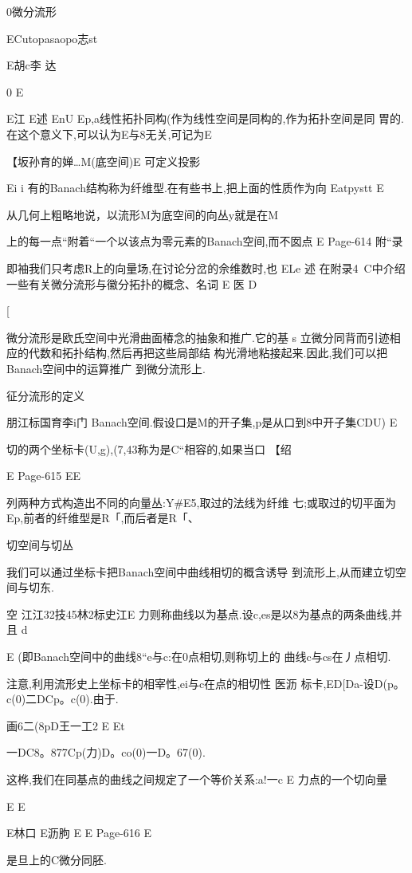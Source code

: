 {0微分流形

ECutopasaopo志st

E胡c李
达

0
E

E江
E述
EnU
Ep,a线性拓扑同构(作为线性空间是同构的,作为拓扑空间是同
胃的.在这个意义下,可以认为E与8无关,可记为E

【坂孙育的婵…M(底空间)E
可定义投影

Ei
i
有的Banach结构称为纤维型.在有些书上,把上面的性质作为向
Eatpystt
E

从几何上粗略地说，以流形M为底空间的向丛y就是在M

上的每一点“附着“一个以该点为零元素的Banach空间,而不囡点
E
Page-614
附“录

即袖我们只考虑R上的向量场,在讨论分岔的佘维数时,也
ELe
述
在附录4~C中介绍一些有关微分流形与徽分拓扑的概念、名词
E
医
D

[

微分流形是欧氏空间中光滑曲面椿念的抽象和推广.它的基
s
立微分同背而引迹相应的代数和拓扑结构,然后再把这些局部结
构光滑地粘接起来.因此,我们可以把Banach空间中的运算推广
到微分流形上.

征分流形的定义

朋江标国育李i门
Banach空间.假设口是M的开子集,p是从口到8中开子集CDU)
E

切的两个坐标卡(U,g),(7,43称为是C“相容的,如果当口
【绍

E
Page-615
EE

列两种方式构造出不同的向量丛:Y#E5,取过的法线为纤维
七;或取过的切平面为Ep,前者的纤维型是R「,而后者是R「、

切空间与切丛

我们可以通过坐标卡把Banach空间中曲线相切的概含诱导
到流形上,从而建立切空间与切东.

空
江江32技45林2标史江E
力则称曲线以为基点.设c,es是以8为基点的两条曲线,并且
d

E
(即Banach空间中的曲线8“e与c:在0点相切,则称切上的
曲线c与cs在丿点相切.

注意,利用流形史上坐标卡的相宰性,ei与c在点的相切性
医沥
标卡,ED[Da-设D(p。c(0)二DCp。c(0).由于.

画6二(8pD王一工2
E
Et

一DC8。877Cp(力)D。co(0)一D。67(0).

这桦,我们在同基点的曲线之间规定了一个等价关系:a!一c
E
力点的一个切向量

E
E

E林口
E沥朐
E
E
Page-616
E

是旦上的C微分同胚.

}
